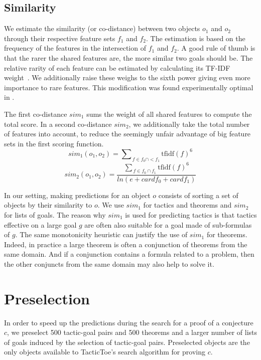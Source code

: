 \documentclass[runningheads,a4paper,draft]{svjour3}
\def\tactictoe{\textsf{TacticToe}\xspace}
\begin{document}
\subsection{Similarity}\label{sec:predictions}
We estimate the similarity (or co-distance) between two objects $o_1$ and $o_2$
through their respective feature sets $f_1$ and $f_2$.
The estimation is based on the frequency of the features in the intersection of
$f_1$ and $f_2$. A good rule of thumb is that the rarer the shared features
are, the more similar two goals should be. The relative rarity of each feature
can be estimated by calculating its TF-IDF weight~\cite{Jones72astatistical}.
We additionally raise these weighs to the sixth power giving
even more importance
to rare features. This modification was found experimentally optimal in
\cite{ckju-pxtp13}.

The first co-distance $sim_1$ sums the weight of all shared
features to compute the total score.
In a second co-distance $sim_2$, we additionally take
the total number of features into account, to reduce the seemingly unfair
advantage of big
feature sets in the first scoring function.
\[sim_1 (o_1, o_2) = {\sum\nolimits_{\,f \in f_0 \cap
<f_1}{\text{tfidf}(f)^{6}}}\]
\[sim_2 (o_1, o_2) = \frac{{\sum\nolimits_{\,f \in f_0 \cap
f_1}{\text{tfidf}(f)^{6}}}}
{ln (e + \mathit{card} f_0 + \mathit{card} f_1)}\]

In our setting, making predictions for an object $o$ consists of sorting a set
of objects by their similarity to $o$. We use $sim_1$ for tactics and theorems
and $sim_2$ for lists of goals. The reason why $sim_1$ is used for
predicting tactics is that tactics effective on a large goal $g$ are often also
suitable for a goal made of sub-formulas of $g$. The same monotonicity
heuristic can justify the use of $sim_1$ for theorems. Indeed, in practice a
large theorem is often a conjunction of theorems from the same domain.
And if a conjunction contains a formula related to a problem, then the other
conjuncts from the same domain may also help to solve it.

\section{Preselection}\label{sec:presel}

In order to speed up the predictions during the search for a proof of a
conjecture $c$, we preselect 500 tactic-goal pairs and 500 theorems and a
larger number of lists of goals induced by the selection of tactic-goal pairs.
Preselected objects are the only objects available to \tactictoe's search
algorithm for proving $c$.
\end{document}
